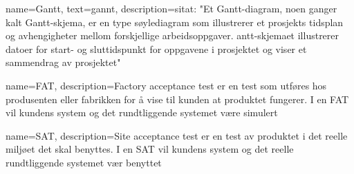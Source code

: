 
{
    name=Gantt,
    text=gannt,
    description={sitat: "Et Gantt-diagram, noen ganger kalt Gantt-skjema, er en type søylediagram som illustrerer et prosjekts tidsplan og avhengigheter mellom forskjellige arbeidsoppgaver. 
    antt-skjemaet illustrerer datoer for start- og sluttidspunkt for oppgavene i prosjektet og viser et sammendrag av prosjektet" \autocite{gls_proj_gannt}}
}

{
    name=FAT,
    description={Factory acceptance test er en test som utføres hos produsenten eller fabrikken for å vise til kunden at produktet fungerer. I en FAT vil kundens system og det rundtliggende systemet være simulert}
}

{
    name=SAT,
    description={Site acceptance test er en test av produktet i det reelle miljøet det skal benyttes. I en SAT vil kundens system og det reelle rundtliggende systemet vær benyttet}
}